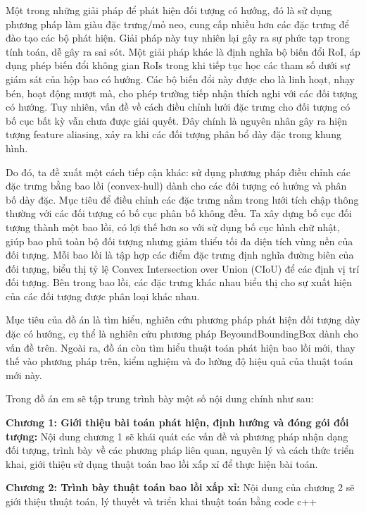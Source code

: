 \documentclass[12pt,a4paper,openany,oneside]{report}
\begin{document}
Một trong những giải pháp để phát hiện đối tượng có hướng, đó là sử dụng phương pháp làm giàu đặc trưng/mỏ neo, cung cấp nhiều hơn các đặc trưng để đào tạo các bộ phát hiện. Giải pháp này tuy nhiên lại gây ra sự phức tạp trong tính toán, dễ gây ra sai sót. Một giải pháp khác là định nghĩa bộ biến đổi RoI, áp dụng phép biến đổi không gian RoIs trong khi tiếp tục học các tham số dưới sự giám sát của hộp bao có hướng. Các bộ biến đổi này được cho là linh hoạt, nhạy bén, hoạt động mượt mà, cho phép trường tiếp nhận thích nghi với các đối tượng có hướng. Tuy nhiên, vấn đề về cách điều chỉnh lưới đặc trưng cho đối tượng có bố cục bất kỳ vẫn chưa được giải quyết. Đây chính là nguyên nhân gây ra hiện tượng feature aliasing, xảy ra khi các đối tượng phân bổ dày đặc trong khung hình.


Do đó, ta đề xuất một cách tiếp cận khác: sử dụng phương pháp điều chỉnh các đặc trưng bằng bao lồi (convex-hull) dành cho các đối tượng có hướng và phân bố dày đặc. Mục tiêu để điều chỉnh các đặc trưng nằm trong lưới tích chập thông thường với các đối tượng có bố cục phân bố không đều. Ta xây dựng bố cục đối tượng thành một bao lồi, có lợi thế hơn so với sử dụng bố cục hình chữ nhật, giúp bao phủ toàn bộ đối tượng nhưng giảm thiểu tối đa diện tích vùng nền của đối tượng. Mỗi bao lồi là tập hợp các điểm đặc trưng định nghĩa đường biên của đối tượng, biểu thị tỷ lệ Convex Intersection over Union (CIoU) để các định vị trí đối tượng. Bên trong bao lồi, các đặc trưng khác nhau biểu thị cho sự xuất hiện của các đối tượng được phân loại khác nhau.


Mục tiêu của đồ án là tìm hiểu, nghiên cứu phương pháp phát hiện đối tượng dày đặc có hướng, cụ thể là nghiên cứu phương pháp BeyoundBoundingBox dành cho vấn đề trên. Ngoài ra, đồ án còn tìm hiểu thuật toán phát hiện bao lồi mới, thay thế vào phương pháp trên, kiểm nghiệm và đo lường độ hiệu quả của thuật toán mới này.


Trong đồ án em sẽ tập trung trình bày một số nội dung chính như sau:

\textbf{Chương 1: Giới thiệu bài toán phát hiện, định hướng và đóng gói đối tượng:}
Nội dung chương 1 sẽ khái quát các vấn đề và phương pháp nhận dạng đối tượng, trình bày về các phương pháp liên quan, nguyên lý và cách thức triển khai, giới thiệu sử dụng thuật toán bao lồi xấp xỉ để thực hiện bài toán.


\textbf{Chương 2: Trình bày thuật toán bao lồi xấp xỉ:}
Nội dung của chương 2 sẽ giới thiệu thuật toán, lý thuyết và triển khai thuật toán bằng code c++
\end{document}
